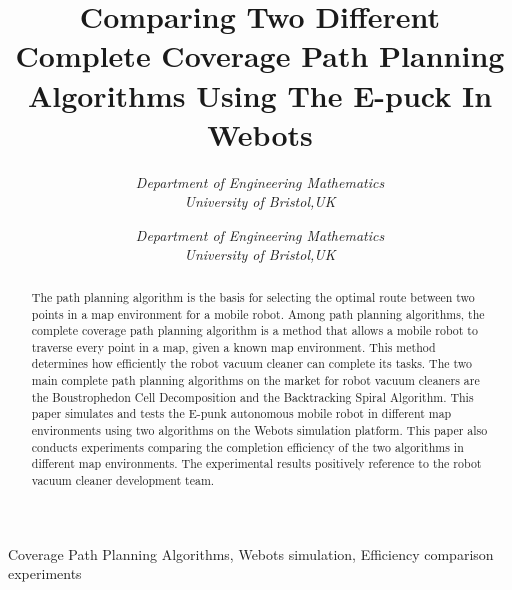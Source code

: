 \documentclass[conference]{IEEEtran}
\begin{document}
\title{Comparing Two Different Complete Coverage Path Planning Algorithms Using The E-puck In Webots}

\author{
  \textit{Department of Engineering Mathematics}\\
  \textit{University of Bristol,UK}
  \and
  \textit{Department of Engineering Mathematics}\\
  \textit{University of Bristol,UK}
}

\maketitle

\begin{abstract}
The path planning algorithm is the basis for selecting the optimal route between two points in a map environment for a mobile robot. Among path planning algorithms, the complete coverage path planning algorithm is a method that allows a mobile robot to traverse every point in a map, given a known map environment. This method determines how efficiently the robot vacuum cleaner can complete its tasks. The two main complete path planning algorithms on the market for robot vacuum cleaners are the Boustrophedon Cell Decomposition and the Backtracking Spiral Algorithm. This paper simulates and tests the E-punk autonomous mobile robot in different map environments using two algorithms on the Webots simulation platform. This paper also conducts experiments comparing the completion efficiency of the two algorithms in different map environments. The experimental results positively reference to the robot vacuum cleaner development team.
\end{abstract}

\def\IEEEkeywordsname{Keywords} 
\begin{IEEEkeywords} Coverage  Path  Planning Algorithms, Webots simulation, Efficiency comparison experiments 
\end{IEEEkeywords} 
\end{document}
